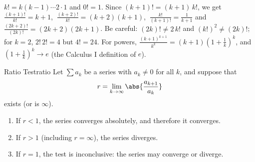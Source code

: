 \documentclass[11pt]{article}
\begin{document}
\begin{remark}
$k!=k(k-1)\cdots2\cdot1$ and $0!=1$. Since $(k+1)!=(k+1)\,k!$, we get $\frac{(k+1)!}{k!}=k+1$, $\ \frac{(k+2)!}{k!}=(k+2)(k+1)$, $\ \frac{k!}{(k+1)!}=\frac1{k+1}$ and $\frac{(2k+2)!}{(2k)!}=(2k+2)(2k+1)$. Be careful: $(2k)!\ne2\,k!$ and $(k!)^2\ne(2k)!$; for $k=2$, $2!\,2!=4$ but $4!=24$. For powers, $\frac{(k+1)^{k+1}}{k^k}=(k+1)\left(1+\frac1k\right)^k$, and $\left(1+\frac1k\right)^k\to e$ (the Calculus I definition of $e$).
\end{remark}

\begin{thm}{Ratio Test}{ratio}
Let $\sum a_k$ be a series with $a_k\ne0$ for all $k$, and suppose that
\[
r=\lim_{k\to\infty}\abs{\frac{a_{k+1}}{a_k}}
\]
exists (or is $\infty$).
\begin{enumerate}
  \item If $r<1$, the series converges absolutely, and therefore it converges.
  \item If $r>1$ (including $r=\infty$), the series diverges.
  \item If $r=1$, the test is inconclusive: the series may converge or diverge.
\end{enumerate}
\end{thm}
\end{document}
